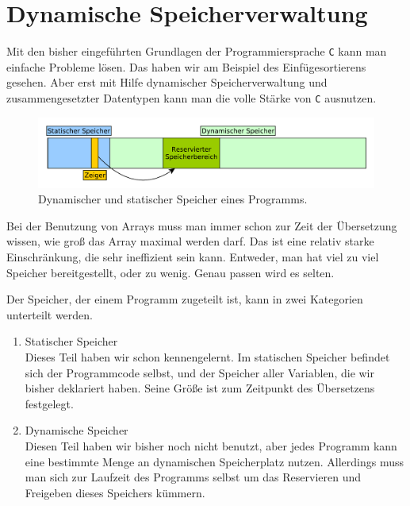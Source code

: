 \newpage

\section{Dynamische Speicherverwaltung}

Mit den bisher eingeführten Grundlagen der Programmiersprache \texttt{C} kann man einfache Probleme lösen.
Das haben wir am Beispiel des Einfügesortierens gesehen.
Aber erst mit Hilfe dynamischer Speicherverwaltung und zusammengesetzter Datentypen kann man die volle Stärke von \texttt{C} ausnutzen.

\begin{figure}
\includegraphics[width=\textwidth]{graphics/zeiger_auf_dynamischen_speicher}
\caption{\label{fig:abmem} Dynamischer und statischer Speicher eines Programms.}
\end{figure}

Bei der Benutzung von Arrays muss man immer schon zur Zeit der Übersetzung wissen, wie groß das Array maximal werden darf.
Das ist eine relativ starke Einschränkung, die sehr ineffizient sein kann.
Entweder, man hat viel zu viel Speicher bereitgestellt, oder zu wenig.
Genau passen wird es selten.

Der Speicher, der einem Programm zugeteilt ist, kann in zwei Kategorien unterteilt werden.
\begin{enumerate}
\item Statischer Speicher\\
  Dieses Teil haben wir schon kennengelernt. 
  Im statischen Speicher befindet sich der Programmcode selbst, und der Speicher aller Variablen, die wir bisher deklariert haben.
  Seine Größe ist zum Zeitpunkt des Übersetzens festgelegt.

\item Dynamische Speicher\\
  Diesen Teil haben wir bisher noch nicht benutzt, aber jedes Programm kann eine bestimmte Menge an dynamischen Speicherplatz nutzen. 
  Allerdings muss man sich zur Laufzeit des Programms selbst um das Reservieren und Freigeben dieses Speichers kümmern.
\end{enumerate}


